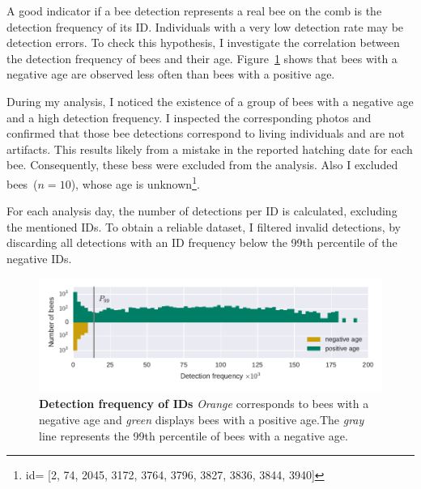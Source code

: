 A good indicator if a bee detection represents a real bee on the comb is the detection frequency of its ID.
Individuals with a very low detection rate may be detection errors.
To check this hypothesis, I investigate the correlation between the detection frequency of bees and their age.
Figure~\ref{fig:filter} shows that bees with a negative age are
observed less often than bees with a positive age.

During my analysis, I noticed the existence of a group of bees with a negative age and a high detection frequency.
I inspected the corresponding photos and confirmed that those bee detections correspond to living individuals and are not artifacts.
This results likely from a mistake in the reported hatching date for each bee.
Consequently, these bess were excluded from the analysis. Also I excluded bees~($n=10$), whose age is unknown\footnote{id= [2,
    74,
    2045,
    3172,
    3764,
    3796,
    3827,
    3836,
    3844,
    3940]}.

For each analysis day, the number of detections per ID is calculated, excluding the mentioned IDs.
To obtain a reliable dataset, I filtered invalid detections, by discarding all detections with an ID frequency below the 99th percentile of the negative IDs.

\begin{figure}[tp]
	\centering
	\includegraphics[width=1.0\textwidth]{Figures/filter}
	\caption[Detection frequency of IDs]{\textbf{Detection frequency of IDs} \emph{Orange} corresponds to bees with a negative age and \emph{green} displays bees with a positive age.\protect\footnotemark The \emph{gray} line represents the 99th percentile of bees with a negative age.}
	\label{fig:filter}
\end{figure}

